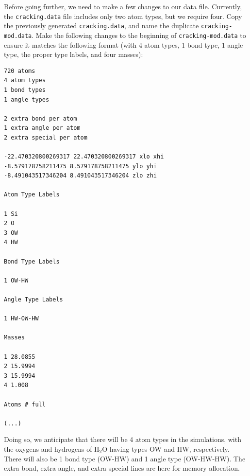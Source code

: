 \documentclass[9pt,tutorial]{livecoms}
\newcommand{\lmpcmd}[1]{\hspace{0pt}\colorbox{listing}{\textcolor{command}{\small{#1}}}\hspace{0pt}} %
\newcommand{\flecmd}[1]{\textcolor{command}{\texttt{#1}}} %
\begin{document}
Before going further, we need to make a few changes to our data file.
Currently, the \flecmd{cracking.data} file includes only two atom types, but we require four.
Copy the previously generated \flecmd{cracking.data}, and name the duplicate \flecmd{cracking-mod.data}.
Make the following changes to the beginning of \flecmd{cracking-mod.data}
to ensure it matches the following format (with 4 atom types,
1 bond type, 1 angle type, the proper type labels, and four masses):
\begin{lstlisting}
720 atoms
4 atom types
1 bond types
1 angle types

2 extra bond per atom
1 extra angle per atom
2 extra special per atom

-22.470320800269317 22.470320800269317 xlo xhi
-8.579178758211475 8.579178758211475 ylo yhi
-8.491043517346204 8.491043517346204 zlo zhi

Atom Type Labels

1 Si
2 O
3 OW
4 HW

Bond Type Labels

1 OW-HW

Angle Type Labels

1 HW-OW-HW

Masses

1 28.0855
2 15.9994
3 15.9994
4 1.008

Atoms # full

(...)
\end{lstlisting}
Doing so, we anticipate that there will be 4 atom types in the simulations,
with the oxygens and hydrogens of $\text{H}_2\text{O}$ having
types \lmpcmd{OW} and \lmpcmd{HW}, respectively.  There
will also be 1 bond type (\lmpcmd{OW-HW}) and 1 angle type (\lmpcmd{OW-HW-HW}).
The \lmpcmd{extra bond}, \lmpcmd{extra angle}, and
\lmpcmd{extra special} lines are here for memory allocation.
\end{document}
